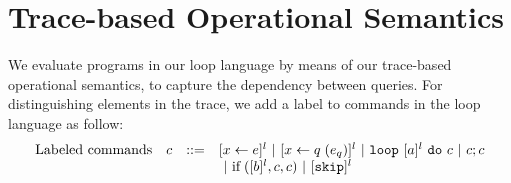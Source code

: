 

\section{ Trace-based Operational Semantics}
\label{sec:adapt-os}
 We evaluate programs in our {loop} language by means of our trace-based operational semantics, to capture the dependency between queries. For distinguishing elements in the trace, we add a label to commands in the {loop} language as follow:
%
\[
\begin{array}{llll}
     \mbox{Labeled commands} & c & ::= &   [\mathrel{ x \leftarrow e }]^{l} ~|~  [\mathrel{ x \leftarrow q }(e_q)]^{l}
 ~|~  \mathtt{loop} ~ [a]^{l} ~ \mathtt{do} ~ c  ~|~ c;c \\
 & & & ~|~ \mbox{if\;}([b]^l, c, c) 	 ~|~ [\mathtt{skip}]^{l} \\
\end{array}
\]

